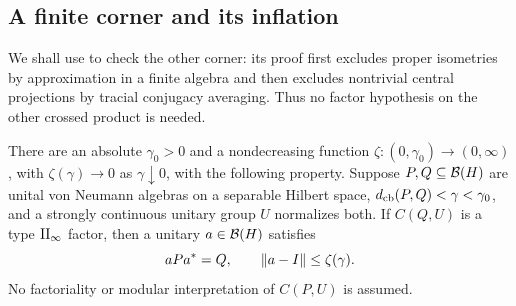 \subsection{A finite corner and its inflation}

We shall use  to check the other corner:
its proof first excludes proper isometries by approximation in a finite
algebra and then excludes nontrivial central projections by tracial
conjugacy averaging.  Thus no factor hypothesis on the other crossed
product is needed.

\begin{proposition}
\label{prop:core-descent}
There are an absolute $\gamma_0>0$ and a nondecreasing function
$\zeta:(0,\gamma_0)\to(0,\infty)$, with $\zeta(\gamma)\to0$ as
$\gamma\downarrow0$, with the following property.  Suppose
$P,Q\subseteq\mathcal B(H)$ are unital von Neumann algebras on a separable
Hilbert space, $d_{\mathrm{cb}}(P,Q)<\gamma<\gamma_0$, and a strongly continuous
unitary group $U$ normalizes both.  If $C(Q,U)$ is a type
$\mathrm{II}_\infty$ factor, then a unitary $a\in\mathcal B(H)$ satisfies
\[
 aPa^*=Q,\qquad \lVert a-I\rVert\le\zeta(\gamma).
\]
No factoriality or modular interpretation of $C(P,U)$ is assumed.
\end{proposition}

